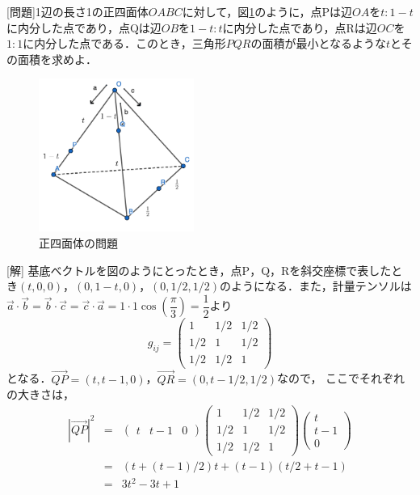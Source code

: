 \documentclass[dvipdfmx,a4]{jsarticle}
\begin{document}
[問題]1辺の長さ1の正四面体\(OABC\)に対して，図\ref{fig2}のように，点Pは辺\(OA\)を\(t:1-t\)に内分した点であり，点Qは辺\(OB\)を\(1-t:t\)に内分した点であり，点Rは辺\(OC\)を\(1:1\)に内分した点である．このとき，三角形\(PQR\)の面積が最小となるような\(t\)とその面積を求めよ．
\begin{figure}[tbh]
  \centering
  \includegraphics[height=5cm]{fig/fig2.png}
  \caption{正四面体の問題}
  \label{fig2}
\end{figure}

[解]
基底ベクトルを図のようにとったとき，点P，Q，Rを斜交座標で表したとき\((t,0,0)\)，\((0,1-t,0)\)，\((0,1/2,1/2)\)のようになる．また，計量テンソルは\(\vec{a}\cdot \vec{b}=\vec{b}\cdot \vec{c}=\vec{c}\cdot \vec{a}=1\cdot 1\cos \left( \dfrac{\pi}{3} \right) = \dfrac{1}{2} \)より
\begin{equation*}
  g_{ij}= 
  \begin{pmatrix}
    1 & 1/2 & 1/2 \\ 
    1/2 & 1 & 1/2 \\
    1/2 & 1/2 & 1
  \end{pmatrix}
\end{equation*}
となる．\(\overrightarrow{QP} = (t, t-1, 0)\)，\(\overrightarrow{QR} = (0, t-1/2, 1/2)\)なので，
ここでそれぞれの大きさは，
\begin{eqnarray*}
  |\overrightarrow{QP}| ^2
  &=&
  \begin{pmatrix}
    t & t-1 & 0
  \end{pmatrix}
  \begin{pmatrix}
    1 & 1/2 & 1/2 \\ 
    1/2 & 1 & 1/2 \\
    1/2 & 1/2 & 1
  \end{pmatrix}
  \begin{pmatrix}
    t\\
    t-1\\
    0
  \end{pmatrix}\\
  &=&
  (t+(t-1)/2)t+(t-1)(t/2+t-1)\\
  &=&
  3t^2 -3t +1
\end{eqnarray*}
\end{document}
